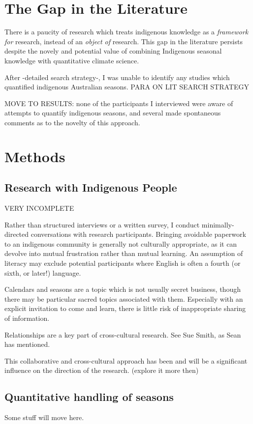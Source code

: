 \section{The Gap in the Literature}

There is a paucity of research which treats indigenous knowledge
as a \emph{framework for} research, instead of an \emph{object of} research.
This gap in the literature persists despite the novely and potential value
of combining Indigenous seasonal knowledge with quantitative climate science.

After -detailed search strategy-, I was unable to identify any studies which 
quantified indigenous Australian seasons.  PARA ON LIT SEARCH STRATEGY


MOVE TO RESULTS: none of the participants I interviewed were aware of
attempts to quantify indigenous seasons, and several made spontaneous
comments as to the novelty of this approach.



\section{Methods}


\subsection{Research with Indigenous People}

VERY INCOMPLETE

Rather than structured interviews or a written survey, I conduct minimally-
directed conversations with research participants.  Bringing avoidable 
paperwork to an indigenous community is generally not culturally appropriate, 
as it can devolve into mutual frustration rather than mutual learning.  An 
assumption of literacy may exclude potential participants where English is 
often a fourth (or sixth, or later!) language.

Calendars and seasons are a topic which is not usually secret business, though 
there may be particular sacred topics associated with them.  Especially with an 
explicit invitation to come and learn, there is little risk of inappropriate 
sharing of information.


Relationships are a key part of cross-cultural research.  See Sue Smith, as 
Sean has mentioned.

This collaborative and cross-cultural approach has been and will be a 
significant influence on the direction of the research. (explore it more then)



\subsection{Quantitative handling of seasons}

Some stuff will move here.



